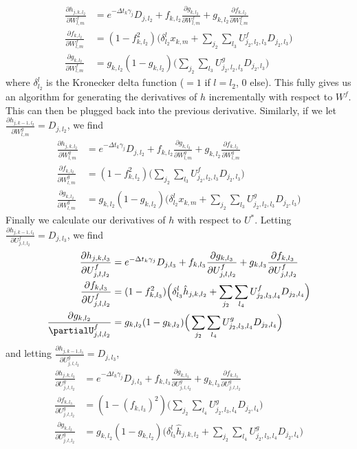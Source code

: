 \begin{align*}
\frac{\partial h_{j,k,l_2}}{\partial W^f_{l,m}} &= e^{-\Delta t_k \gamma_j} D_{j,l_2} + f_{k,l_2} \frac{\partial g_{k,l_2}}{\partial W^f_{l,m}} + g_{k,l_2} \frac{\partial f_{k,l_2}}{\partial W^f_{l,m}}
\\\frac{\partial f_{k,l_2}}{\partial W^f_{l,m}}&= (1-f_{k,l_2}^2)\Big(\delta^l_{l_2} x_{k,m} + \sum_{j_2} \sum_{l_3} U_{j_2,l_2,l_3}^f D_{j_2,l_3}\Big)
\\\frac{\partial g_{k,l_2}}{\partial W^f_{l,m}}&= g_{k,l_2}(1-g_{k,l_2})\Big(\sum_{j_2} \sum_{l_3} U_{j_2,l_2,l_3}^g D_{j_2,l_3}\Big)
\end{align*}
where $\delta^l_{l_2}$ is the Kronecker delta function ($=1$ if $l=l_2$, $0$ else).
This fully gives us an algorithm for generating the derivatives of $h$ incrementally with respect to $W^f$. This can then be plugged back into the previous derivative. Similarly, if we let  $\frac{\partial h_{j,k-1,l_2}}{\partial W^g_{l,m}} = D_{j,l_2}$, we find 
\begin{align*}
\frac{\partial h_{j,k,l_2}}{\partial W^g_{l,m}} &= e^{-\Delta t_k \gamma_j} D_{j,l_2} + f_{k,l_2} \frac{\partial g_{k,l_2}}{\partial W^g_{l,m}} + g_{k,l_2} \frac{\partial f_{k,l_2}}{\partial W^g_{l,m}}
\\\frac{\partial f_{k,l_2}}{\partial W^g_{l,m}}&= (1-f_{k,l_2}^2)\Big(\sum_{j_2} \sum_{l_3} U_{j_2,l_2,l_3}^f D_{j_2,l_3}\Big)
\\\frac{\partial g_{k,l_2}}{\partial W^g_{l,m}}&= g_{k,l_2}(1-g_{k,l_2})\Big(\delta^l_{l_2} x_{k,m} + \sum_{j_2} \sum_{l_3} U_{j_2,l_2,l_3}^g D_{j_2,l_3}\Big)
\end{align*}
Finally we calculate our derivatives of $h$ with respect to $U^*$. Letting  $\frac{\partial h_{j,k-1,l_3}}{\partial U^f_{j,l,l_2}} = D_{j,l_3}$, we find 
\begin{align*}
\frac{\partial h_{j,k,l_3}}{\partial U^f_{j,l,l_2}} &= e^{-\Delta t_k \gamma_j} D_{j,l_3} + f_{k,l_3} \frac{\partial g_{k,l_3}}{\partial  U^f_{j,l,l_2}} + g_{k,l_3} \frac{\partial f_{k,l_3}}{\partial  U^f_{j,l,l_2}}
\\\frac{\partial f_{k,l_3}}{\partial U^f_{j,l,l_2}}&= (1-f_{k,l_3}^2)\Big(\delta^l_{l_3}\hat{h}_{j,k,l_2} +\sum_{j_2} \sum_{l_4} U_{j_2,l_3,l_4}^f D_{j_2,l_4}\Big)
\\\frac{\partial g_{k,l_2}}{\partialU^f_{j,l,l_2}}&= g_{k,l_2}(1-g_{k,l_2})\Big(\sum_{j_2} \sum_{l_4} U_{j_2,l_3,l_4}^g D_{j_2,l_4}\Big)
\end{align*}
and letting  $\frac{\partial h_{j,k-1,l_3}}{\partial U^g_{j,l,l_2}} = D_{j,l_3}$, 
\begin{align*}
\frac{\partial h_{j,k,l_3}}{\partial U^g_{j,l,l_2}} &= e^{-\Delta t_k \gamma_j} D_{j,l_3} + f_{k,l_3} \frac{\partial g_{k,l_3}}{\partial  U^g_{j,l,l_2}} + g_{k,l_3} \frac{\partial f_{k,l_3}}{\partial  U^g_{j,l,l_2}}
\\\frac{\partial f_{k,l_3}}{\partial U^g_{j,l,l_2}}&= (1-(f_{k,l_3})^2)\Big(\sum_{j_2} \sum_{l_4} U_{j_2,l_3,l_4}^g D_{j_2,l_4}\Big)
\\\frac{\partial g_{k,l_2}}{\partial U^g_{j,l,l_2}}&= g_{k,l_2}(1-g_{k,l_2})\Big(\delta^l_{l_3}\hat{h}_{j,k,l_2}+\sum_{j_2} \sum_{l_4} U_{j_2,l_3,l_4}^g D_{j_2,l_4}\Big)
\end{align*}

